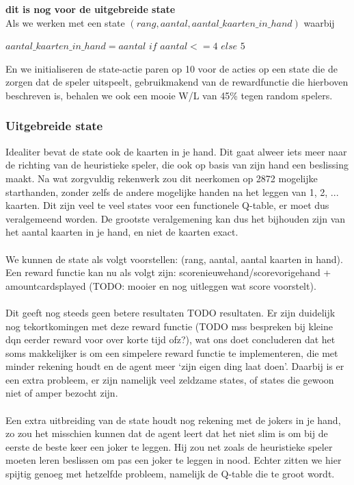 \documentclass[11pt]{article}
\begin{document}
\textbf{dit is nog voor de uitgebreide state}\\
Als we werken met een state $(rang, aantal, aantal\_kaarten\_in\_hand)$ waarbij
\begin{center}
$aantal\_kaarten\_in\_hand = aantal$ $if$ $ aantal <= 4$ $else$ $5$
\end{center}
En we initialiseren de state-actie paren op 10 voor de acties op een state die de zorgen dat de speler uitspeelt, gebruikmakend van de rewardfunctie die hierboven beschreven is, behalen we ook een mooie W/L van 45\% tegen random spelers.




\subsubsection{Uitgebreide state}
Idealiter bevat de state ook de kaarten in je hand. Dit gaat alweer iets meer naar de richting van de heuristieke speler, die ook op basis van zijn hand een beslissing maakt. Na wat zorgvuldig rekenwerk zou dit neerkomen op 2872 mogelijke starthanden, zonder zelfs de andere mogelijke handen na het leggen van 1, 2, ... kaarten. Dit zijn veel te veel states voor een functionele Q-table, er moet dus veralgemeend worden. De grootste veralgemening kan dus het bijhouden zijn van het aantal kaarten in je hand, en niet de kaarten exact.\\\\

We kunnen de state als volgt voorstellen: (rang, aantal, aantal kaarten in hand). Een reward functie kan nu als volgt zijn: scorenieuwehand/scorevorigehand + amountcardsplayed (TODO: mooier en nog uitleggen wat score voorstelt).\\\\
Dit geeft nog steeds geen betere resultaten TODO resultaten. Er zijn duidelijk nog tekortkomingen met deze reward functie (TODO mss bespreken bij kleine dqn \- eerder reward voor over korte tijd ofz?), wat ons doet concluderen dat het soms makkelijker is om een simpelere reward functie te implementeren, die met minder rekening houdt en de agent meer `zijn eigen ding laat doen'. Daarbij is er een extra probleem, er zijn namelijk  veel zeldzame states, of states die gewoon niet of amper bezocht zijn. \\\\
Een extra uitbreiding van de state houdt nog rekening met de jokers in je hand, zo zou het misschien kunnen dat de agent leert dat het niet slim is om bij de eerste de beste keer een joker te leggen. Hij zou net zoals de heuristieke speler moeten leren beslissen om pas een joker te leggen in nood. Echter zitten we hier spijtig genoeg met hetzelfde probleem, namelijk de Q-table die te groot wordt.\\\\
\end{document}
